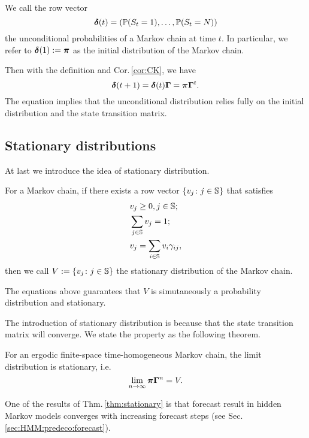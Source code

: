 		\begin{defn}
		\label{defn:initial}
		We call the row vector
			\begin{equation}
			\label{eq:preliminary:markov:initial}
			{\boldsymbol\delta}(t) = \left(\mathbb{P}(S_t=1),\dots,\mathbb{P}(S_t=N)\right)
			\end{equation}
		the unconditional probabilities of a Markov chain at time $t$.
		In particular, we refer to ${\boldsymbol\delta}(1) := {\boldsymbol\pi}$ as the initial distribution of the Markov chain.
		\end{defn}
Then with the definition and Cor.\,\ref{cor:CK}, we have
		\begin{equation}
		\label{eq:preliminary:markov:unconditional}
		{\boldsymbol\delta}(t+1) = {\boldsymbol\delta}(t){\boldsymbol\Gamma} = {\boldsymbol\pi}{\boldsymbol\Gamma}^{t}.
		\end{equation}
The equation implies that the unconditional distribution relies fully on 
the initial distribution and the state transition matrix.


\subsection{Stationary distributions}
\label{sec:preliminary:markov:stationary}
At last we introduce the idea of stationary distribution.

		\begin{defn}
		\label{defn:stationary}
		For a Markov chain, if there exists a row vector $\{v_j \colon j \in {\mathbb S}\}$ that satisfies
			\begin{subequations}
			\begin{align}
			&v_j  \geq 0, j \in {\mathbb S}; \\
			&\sum_{j \in {\mathbb S}} v_j = 1;\\
			&v_j  = \sum_{i \in {\mathbb S}} v_i\gamma_{ij},
			\end{align}
			\end{subequations}
		then we call $V := \{v_j \colon j \in {\mathbb S}\}$ the stationary distribution of the Markov chain.
		\end{defn}
The equations above guarantees that $V$ is simutaneously a probability distribution and stationary.

The introduction of stationary distribution is because that 
the state transition matrix will converge.
We state the property as the following theorem.

		\begin{thm}
		\label{thm:stationary}
		For an ergodic finite-space time-homogeneous Markov chain,
		the limit distribution is stationary, i.e.
			\begin{equation}
			\label{eq:preliminary:markov:stationary}
			\lim_{n \rightarrow \infty} {\boldsymbol\pi}{\boldsymbol\Gamma}^{n} = V.
			\end{equation}
		\end{thm}
One of the results of Thm.\,\ref{thm:stationary} is that forecast result in hidden Markov models
converges with increasing forecast steps
(see Sec.\,\ref{sec:HMM:predeco:forecast}).

